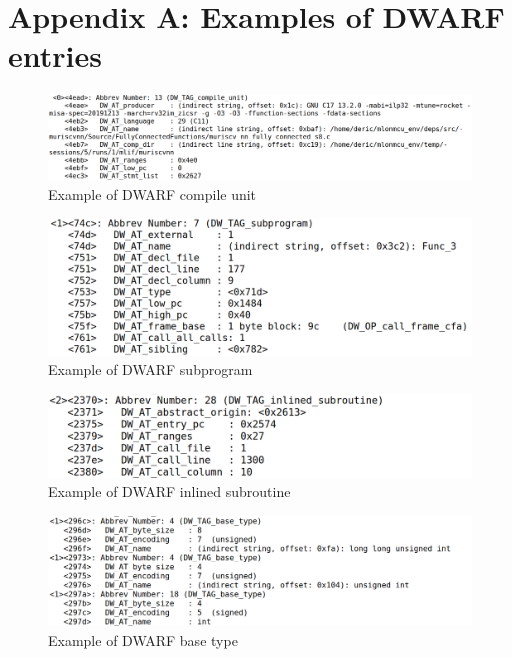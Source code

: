 \appendix

\section{Appendix A: Examples of DWARF entries}
\begin{figure}[ht]
    \centering
    \includegraphics[width=.95\linewidth]{figures/DWARF_compile_unit.png}
    \caption{Example of DWARF compile unit}
    \label{fig:dwarf_compile_unit}
\end{figure}

\begin{figure}[ht]
    \centering
    \includegraphics[width=.95\linewidth]{figures/DWARF_subprogram.png}
    \caption{Example of DWARF subprogram}
    \label{fig:dwarf_subprogram}
\end{figure}

\begin{figure}[ht]
    \centering
    \includegraphics[width=.95\linewidth]{figures/DWARF_inlined_subroutine.png}
    \caption{Example of DWARF inlined subroutine}
    \label{fig:dwarf_inlined_subroutine}
\end{figure}

\begin{figure}[ht]
    \centering
    \includegraphics[width=.95\linewidth]{figures/DWARF_base_type.png}
    \caption{Example of DWARF base type}
    \label{fig:dwarf_base_type}
\end{figure}

